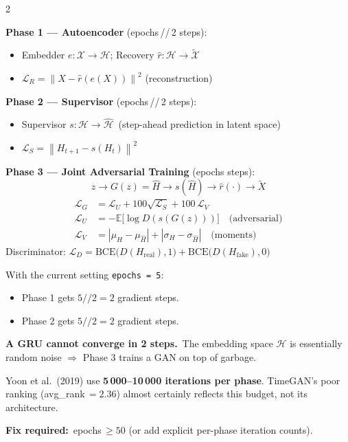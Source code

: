 \documentclass[10pt]{article}
\newcommand{\tealbox}[2]{\begin{tcolorbox}[mybox={Teal}{LBg},title={#1}]#2\end{tcolorbox}}
\newcommand{\redbox}[2]{\begin{tcolorbox}[mybox={DRed}{RBg},title={#1}]#2\end{tcolorbox}}
\newcommand{\E}{\mathbb{E}}
\newcommand{\norm}[1]{\left\|#1\right\|}
\begin{document}
\begin{multicols}{2}
\columnbreak

\tealbox{The Four-Phase Training Algorithm}{%
\textbf{Phase 1 --- Autoencoder} (epochs\,//\,2 steps):
\begin{itemize}
  \item Embedder $e: \mathcal{X} \to \mathcal{H}$; Recovery $\hat{r}: \mathcal{H} \to \tilde{\mathcal{X}}$
  \item $\mathcal{L}_R = \norm{X - \hat{r}(e(X))}^2$ \quad (reconstruction)
\end{itemize}

\textbf{Phase 2 --- Supervisor} (epochs\,//\,2 steps):
\begin{itemize}
  \item Supervisor $s: \mathcal{H} \to \hat{\mathcal{H}}$\ (step-ahead prediction in latent space)
  \item $\mathcal{L}_S = \norm{H_{t+1} - s(H_t)}^2$
\end{itemize}

\textbf{Phase 3 --- Joint Adversarial Training} (epochs steps):
\begin{equation*}
  z \to G(z)=\hat{H} \to s(\hat{H}) \to \hat{r}(\cdot) \to \tilde{X}
\end{equation*}
\begin{align*}
  \mathcal{L}_G &= \mathcal{L}_U + 100\sqrt{\mathcal{L}_S} + 100\,\mathcal{L}_V \\[2pt]
  \mathcal{L}_U &= -\E\!\bigl[\log D(s(G(z)))\bigr] \quad\text{(adversarial)} \\
  \mathcal{L}_V &= |\mu_H - \mu_{\hat{H}}| + |\sigma_H - \sigma_{\hat{H}}| \quad\text{(moments)}
\end{align*}
Discriminator: $\mathcal{L}_D = \text{BCE}\!\bigl(D(H_\text{real}),1\bigr) + \text{BCE}\!\bigl(D(H_\text{fake}),0\bigr)$}

\redbox{Critical Issue: Training Budget}{%
With the current setting \texttt{epochs = 5}:
\begin{itemize}
  \item Phase 1 gets $5 // 2 = 2$ gradient steps.
  \item Phase 2 gets $5 // 2 = 2$ gradient steps.
\end{itemize}
\textbf{A GRU cannot converge in 2 steps.}\ The embedding space $\mathcal{H}$ is essentially random noise $\Rightarrow$ Phase 3 trains a GAN on top of garbage.

Yoon et al.\ (2019) use \textbf{5\,000--10\,000 iterations per phase}. TimeGAN's poor ranking (avg\_rank\,$= 2.36$) almost certainly reflects this budget, not its architecture.

\textbf{Fix required:}\ epochs\,$\geq 50$ (or add explicit per-phase iteration counts).}

\end{multicols}
\end{document}
